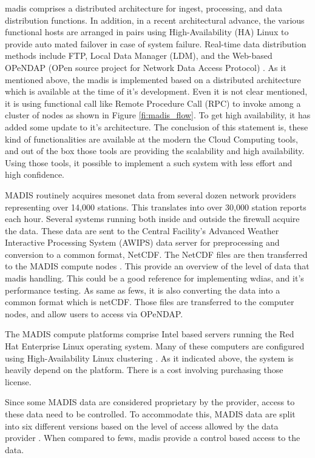 \acrshort{madis} comprises a distributed architecture for ingest, processing, and data distribution functions.
In addition, in a recent architectural advance, the various functional hosts are arranged in pairs using High-Availability (HA) Linux to provide auto mated failover in case of system failure. Real-time data distribution methods include FTP, Local Data Manager (LDM), and the Web-based OPeNDAP (OPen source project for Network Data Access Protocol) \cite{Macdermaid2005ARCHITECTUREP2.39}. As it mentioned above, the \acrshort{madis} is implemented based on a distributed architecture which is available at the time of it's development. Even it is not clear mentioned, it is using functional call like Remote Procedure Call (RPC) to invoke among a cluster of nodes as shown in Figure \ref{fi:madis_flow}. To get high availability, it has added some update to it's architecture. The conclusion of this statement is, these kind of functionalities are available at the modern the Cloud Computing tools, and out of the box those tools are providing the scalability and high availability. Using those tools, it possible to implement a such system with less effort and high confidence.

MADIS routinely acquires mesonet data from several dozen network providers representing over 14,000 stations. This translates into over 30,000 station reports each hour. Several systems running both inside and outside the firewall acquire the data. These data are sent to the Central Facility's Advanced Weather Interactive Processing System (AWIPS) data server for preprocessing and conversion to a common format, NetCDF. The NetCDF files are then transferred to the MADIS compute nodes \cite{Macdermaid2005ARCHITECTUREP2.39}. This provide an overview of the level of data that \acrshort{madis} handling. This could be a good reference for implementing \acrshort{wdias}, and it's performance testing. As same as \acrshort{fews}, it is also converting the data into a common format which is \acrshort{netCDF}. Those files are transferred to the computer nodes, and allow users to access via OPeNDAP.

The MADIS compute platforms comprise Intel based servers running the Red Hat Enterprise Linux operating system. Many of these computers are configured using High-Availability Linux clustering \cite{Macdermaid2005ARCHITECTUREP2.39}. As it indicated above, the system is heavily depend on the platform. There is a cost involving purchasing those license.

Since some MADIS data are considered proprietary by the provider, access to these data need to be controlled. To accommodate this, MADIS data are split into six different versions based on the level of access allowed by the data provider \cite{Macdermaid2005ARCHITECTUREP2.39}. When compared to \acrshort{fews}, \acrshort{madis} provide a control based access to the data.



